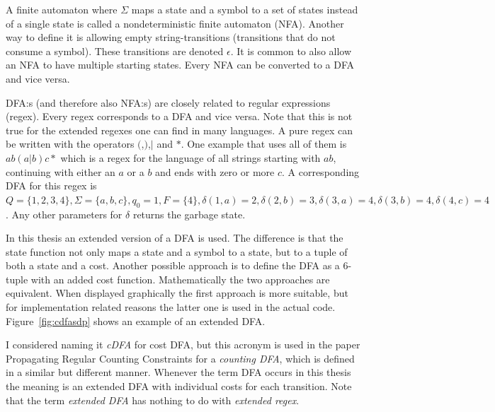 \documentclass[a4paper,11pt]{article}
\begin{document}
A finite automaton where $\Sigma$ maps a state and a symbol to a set of states instead of a single state is called a nondeterministic finite automaton (NFA). Another way to define it is allowing empty string-transitions (transitions that do not consume a symbol). These transitions are denoted $\epsilon$. It is common to also allow an NFA to have multiple starting states. Every NFA can be converted to a DFA and vice versa.

DFA:s (and therefore also NFA:s) are closely related to regular expressions (regex). Every regex corresponds to a DFA and vice versa. Note that this is not true for the extended regexes one can find in many languages. A pure regex can be written with the operators $($,$)$,$|$ and $*$. One example that uses all of them is $ab(a|b)c*$ which is a regex for the language of all strings starting with $ab$, continuing with either an $a$ or a $b$ and ends with zero or more $c$. A corresponding DFA for this regex is $Q=\{1,2,3,4\}, \Sigma=\{a,b,c\}, q_0=1, F=\{4\}, \delta(1,a)=2, \delta(2,b)=3, \delta(3,a)=4, \delta(3,b)=4, \delta(4,c)=4$. Any other parameters for $\delta$ returns the garbage state.

In this thesis an extended version of a DFA is used. The difference is that the state function not only maps a state and a symbol to a state, but to a tuple of both a state and a cost. Another possible approach is to define the DFA as a 6-tuple with an added cost function. Mathematically the two approaches are equivalent. When displayed graphically the first approach is more suitable, but for implementation related reasons the latter one is used in the actual code. Figure~\ref{fig:cdfasdp} shows an example of an extended DFA.

I considered naming it \textit{cDFA} for cost DFA, but this acronym is used in the paper Propagating Regular Counting Constraints for a \textit{counting DFA}, which is defined in a similar but different manner. Whenever the term DFA occurs in this thesis the meaning is an extended DFA with individual costs for each transition. Note that the term \textit{extended DFA} has nothing to do with \textit{extended regex}.
\end{document}
